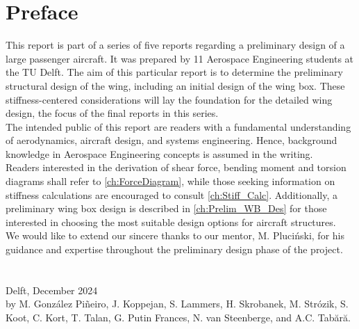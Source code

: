 \chapter*{Preface}
This report is part of a series of five reports regarding a preliminary design of a large passenger aircraft. It was prepared by 11 Aerospace Engineering students at the TU Delft. The aim of this particular report is to determine the preliminary structural design of the wing, including an initial design of the wing box. These stiffness-centered considerations will lay the foundation for the detailed wing design, the focus of the final reports in this series.\\

\noindent The intended public of this report are readers with a fundamental understanding of aerodynamics, aircraft design, and systems engineering. Hence, background knowledge in Aerospace Engineering concepts is assumed in the writing. \\

\noindent Readers interested in the derivation of shear force, bending moment and torsion diagrams shall refer to \autoref{ch:ForceDiagram}, while those seeking information on stiffness calculations are encouraged to consult \autoref{ch:Stiff_Calc}. Additionally, a preliminary wing box design is described in \autoref{ch:Prelim_WB_Des} for those interested in choosing the most suitable design options for aircraft structures.\\

\noindent We would like to extend our sincere thanks to our mentor, M. Pluciński, for his guidance and expertise throughout the preliminary design phase of the project.\\
\\
\\

\noindent Delft, December 2024\\

\noindent by M. González Piñeiro, J. Koppejan, S. Lammers, H. Skrobanek, M. Strózik, S. Koot, C. Kort, T. Talan, G. Putin Frances, N. van Steenberge, and A.C. Tabără.

{\makeatletter\itshape
 
    
\makeatother}
